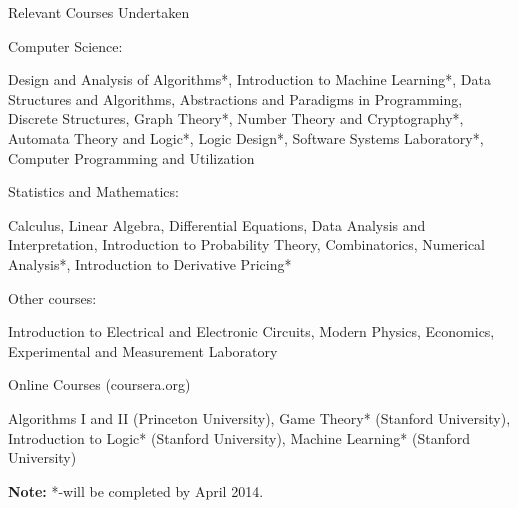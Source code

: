 \documentclass{resume2} %
\begin{document}
\begin{rSection}{Relevant Courses Undertaken}
\begin{rSubsection}{Computer Science:}{}{}{}
\item Design and Analysis of Algorithms*, Introduction to Machine Learning*, Data Structures and Algorithms, Abstractions and
Paradigms in Programming, Discrete Structures, Graph Theory*, Number Theory and Cryptography*, Automata Theory and Logic*, Logic
Design*, Software Systems Laboratory*, Computer Programming and Utilization

\end{rSubsection}

\begin{rSubsection}{Statistics and Mathematics:}{}{}{}
\item Calculus, Linear Algebra, Differential Equations, Data Analysis and Interpretation, Introduction to Probability Theory, Combinatorics, Numerical Analysis*, Introduction to Derivative Pricing*
\end{rSubsection}

\begin{rSubsection}{Other courses:}{}{}{}
\item Introduction to Electrical and Electronic Circuits, Modern Physics, Economics, Experimental and Measurement Laboratory
\end{rSubsection}

\begin{rSubsection}{Online Courses (coursera.org)}{}{}{}
\item Algorithms I and II (Princeton University), Game Theory* (Stanford University), Introduction to Logic* (Stanford University), Machine Learning* (Stanford University)
\end{rSubsection}
\textbf{Note:} *-will be completed by April 2014.
\end{rSection}
\end{document}
